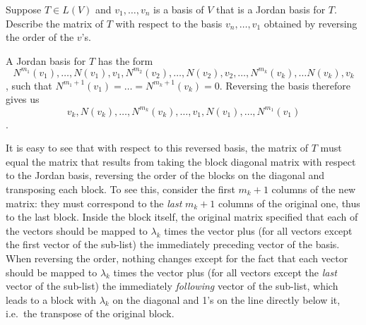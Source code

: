 \begin{exercise}{4}
    Suppose $T \in L(V)$ and $v_1, \ldots, v_n$ is a basis of $V$ that is a Jordan basis for $T$. Describe the matrix of $T$ with respect to the basis $v_n, \ldots, v_1$ obtained by reversing the order of the $v$'s.
\end{exercise}

\begin{solution}

    A Jordan basis for $T$ has the form 
    $$N^{m_1}(v_1), \ldots, N(v_1), v_1, N^{m_2}(v_2), \ldots, N(v_2), v_2, \ldots, N^{m_k}(v_k), \ldots N(v_k), v_k$$
    , such that $N^{m_1+1}(v_1) = \ldots = N^{m_k+1}(v_k) = 0$. Reversing the basis therefore gives us $$v_k, N(v_k), \ldots, N^{m_k}(v_k), \ldots, v_1, N(v_1), \ldots, N^{m_1}(v_1)$$.

    It is easy to see that with respect to this reversed basis, the matrix of $T$ must equal the matrix that results from taking the block diagonal matrix with respect to the Jordan basis, reversing the order of the blocks on the diagonal and transposing each block. To see this, consider the first $m_k+1$ columns of the new matrix: they must correspond to the \textit{last} $m_k + 1$ columns of the original one, thus to the last block. Inside the block itself, the original matrix specified that each of the vectors should be mapped to $\lambda_k$ times the vector plus (for all vectors except the first vector of the sub-list) the immediately preceding vector of the basis. When reversing the order, nothing changes except for the fact that each vector should be mapped to $\lambda_k$ times the vector plus (for all vectors except the \textit{last} vector of the sub-list) the immediately \textit{following} vector of the sub-list, which leads to a block with $\lambda_k$ on the diagonal and 1's on the line directly below it, i.e.\ the transpose of the original block.
\end{solution}
